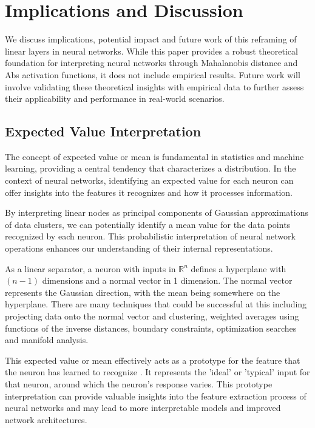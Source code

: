 
\section{Implications and Discussion}
\label{sec:discussion}

We discuss implications, potential impact and future work of this reframing of linear layers in neural networks. While this paper provides a robust theoretical foundation for interpreting neural networks through Mahalanobis distance and Abs activation functions, it does not include empirical results. Future work will involve validating these theoretical insights with empirical data to further assess their applicability and performance in real-world scenarios.

\subsection{Expected Value Interpretation}

The concept of expected value or mean is fundamental in statistics and machine learning, providing a central tendency that characterizes a distribution. In the context of neural networks, identifying an expected value for each neuron can offer insights into the features it recognizes and how it processes information.

By interpreting linear nodes as principal components of Gaussian approximations of data clusters, we can potentially identify a mean value for the data points recognized by each neuron. This probabilistic interpretation of neural network operations enhances our understanding of their internal representations.

As a linear separator, a neuron with inputs in $\mathbb{R}^n$ defines a hyperplane with $(n-1)$ dimensions and a normal vector in 1 dimension. The normal vector represents the Gaussian direction, with the mean being somewhere on the hyperplane. There are many techniques that could be successful at this including projecting data onto the normal vector and clustering, weighted averages using functions of the inverse distances, boundary constraints, optimization searches and manifold analysis.

This expected value or mean effectively acts as a prototype for the feature that the neuron has learned to recognize \citep{li2018deep}. It represents the 'ideal' or 'typical' input for that neuron, around which the neuron's response varies. This prototype interpretation can provide valuable insights into the feature extraction process of neural networks and may lead to more interpretable models and improved network architectures.

